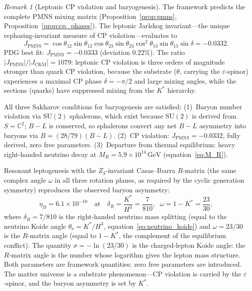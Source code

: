 \documentclass[11pt,a4paper]{article}
\theoremstyle{definition}
\theoremstyle{remark}
\newtheorem{remark}[theorem]{Remark}
\newcommand{\C}{\mathbb{C}}
\newcommand{\SU}{\mathrm{SU}}
\begin{document}
\begin{remark}[Leptonic CP violation and baryogenesis]\label{rem:jarlskog}
The framework predicts the complete PMNS mixing matrix (Proposition~\ref{prop:pmns}, Proposition~\ref{prop:cp_phases}). The leptonic Jarlskog invariant---the unique rephasing-invariant measure of CP violation---evaluates to
\begin{equation}\label{eq:jarlskog}
J_{\mathrm{PMNS}} = \cos\theta_{12}\sin\theta_{12}\cos\theta_{23}\sin\theta_{23}\cos^2\!\theta_{13}\sin\theta_{13}\sin\delta = -0.0332.
\end{equation}
PDG best fit: $J_{\mathrm{PMNS}}=-0.0333$ (deviation $0.22\%$). The ratio $|J_{\mathrm{PMNS}}|/|J_{\mathrm{CKM}}|=1079$: leptonic CP violation is three orders of magnitude stronger than quark CP violation, because the substrate ($\theta$, carrying the $\varepsilon$-spinor) experiences a maximal CP phase $\delta=-\pi/2$ and large mixing angles, while the sections (quarks) have suppressed mixing from the $K^*$ hierarchy.

All three Sakharov conditions for baryogenesis are satisfied: (1)~Baryon number violation via $\SU(2)$ sphalerons, which exist because $\SU(2)$ is derived from $S=\C^2$; $B\!-\!L$ is conserved, so sphalerons convert any net $B\!-\!L$ asymmetry into baryons via $B=(28/79)(B\!-\!L)$. (2)~CP violation: $J_{\mathrm{PMNS}}=-0.0332$, fully derived, zero free parameters. (3)~Departure from thermal equilibrium: heavy right-handed neutrino decay at $M_R=5.9\times 10^{14}\,\mathrm{GeV}$ (equation~\ref{eq:M_R}).

Resonant leptogenesis with the $Z_3$-invariant Casas--Ibarra $R$-matrix (the same complex angle $\omega$ in all three rotation planes, as required by the cyclic generation symmetry) reproduces the observed baryon asymmetry:
\begin{equation}\label{eq:baryon_asymmetry}
\eta_B = 6.1\times 10^{-10}\quad\text{at}\quad \delta_R = \frac{K^*}{H^3} = \frac{7}{810},\;\; \omega = 1-K^* = \frac{23}{30},
\end{equation}
where $\delta_R=7/810$ is the right-handed neutrino mass splitting (equal to the neutrino Koide angle $\theta_\nu=K^*/H^3$, equation~\ref{eq:neutrino_koide}) and $\omega=23/30$ is the $R$-matrix angle (equal to $1-K^*$, the complement of the equilibrium conflict). The quantity $\sigma=-\ln(23/30)$ is the charged-lepton Koide angle: the $R$-matrix angle is the number whose logarithm gives the lepton mass structure. Both parameters are framework quantities; zero free parameters are introduced. The matter universe is a substrate phenomenon---CP violation is carried by the $\varepsilon$-spinor, and the baryon asymmetry is set by $K^*$.
\end{remark}
\end{document}
